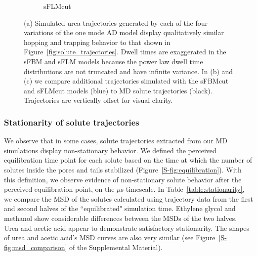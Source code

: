 \documentclass[aps,pre,preprint,groupedaddress,longbibliography]{revtex4-2}
\begin{document}
\begin{figure}
\begin{subfigure}{0.325\textwidth}
  \caption{sFLMcut}\label{fig:ad_realizations_sFLMcut_stacked}
  \end{subfigure}
  \caption{(a) Simulated urea trajectories generated by each of the four
	  variations of the one mode AD model display qualitatively similar
	  hopping and trapping behavior to that shown in
	  Figure~\ref{fig:solute_trajectories}. Dwell times are exaggerated in
	  the sFBM and sFLM models because the power law dwell time
	  distributions are not truncated and have infinite variance. In (b)
	  and (c) we compare additional trajectories simulated with the sFBMcut
	  and sFLMcut models (blue) to MD solute trajectories (black).
	  Trajectories are vertically offset for visual clarity.
  }\label{fig:ad_eyetest}
  \end{figure}
    
  
  \subsubsection{Stationarity of solute trajectories}\label{section:stationarity}
  
  We observe that in some cases, solute trajectories extracted from our MD
  simulations display non-stationary behavior. We defined the perceived
  equilibration time point for each solute based on the time at which the
  number of solutes inside the pores and tails stabilized
  (Figure~\ref{S-fig:equilibration}).  With this definition, we observe
  evidence of non-stationary solute behavior after the perceived equilibration
  point, on the $\mu$s timescale. In Table~\ref{table:stationarity}, we compare
  the MSD of the solutes calculated using trajectory data from the first and
  second halves of the ``equilibrated" simulation time. Ethylene glycol and
  methanol show considerable differences between the MSDs of the two halves.
  Urea and acetic acid appear to demonstrate satisfactory stationarity. The
  shapes of urea and acetic acid's MSD curves are also very similar (see
  Figure~\ref{S-fig:msd_comparison} of the Supplemental Material).
  
\end{document}
